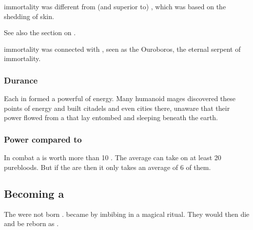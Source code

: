 \Draconic immortality was different from (and superior to) , which was based on the shedding of skin. 

See also the section on . 

\Draconic immortality was connected with \KhothSell, seen as the Ouroboros, the eternal serpent of immortality.





\subsubsection{Durance \nexi}
Each \dragon in  formed a powerful \nexus of energy. 
Many humanoid mages discovered these points of energy and built citadels and even cities there, unaware that their power flowed from a \dragon that lay entombed and sleeping beneath the earth. 





\subsubsection{Power compared to \resphain}
In combat a \dragon is worth more than 10 \resphain. 
The average \dragon can take on at least 20 purebloods. 
But if the \resphain are  then it only takes an average of 6 of them.









\subsection{Becoming a \dragon}
The \dragons{} were not born \dragons. 
\Ophidians became \dragons{} by imbibing \xsic{}  in a magical ritual. 
They would then die and be reborn as \dragons. 

